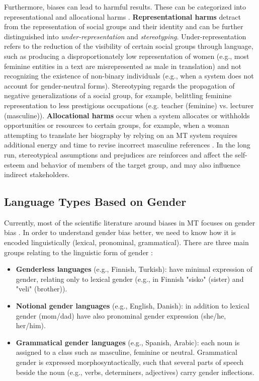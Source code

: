 Furthermore, biases can lead to harmful results. These can be categorized into representational and allocational harms \parencite{Savoldi_2021}. \textbf{Representational harms} detract from the representation of social groups and their identity and can be further distinguished into \textit{under-representation} and \textit{stereotyping}. Under-representation refers to the reduction of the visibility of certain social groups through language, such as producing a disproportionately low representation of women (e.g., most feminine entities in a text are misrepresented as male in translation) and not recognizing the existence of non-binary individuals (e.g., when a system does not account for gender-neutral forms). Stereotyping regards the propagation of negative generalizations of a social group, for example, belittling feminine representation to less prestigious occupations (e.g. teacher (feminine) vs. lecturer (masculine)). \textbf{Allocational harms} occur when a system allocates or withholds opportunities or resources to certain groups, for example, when a woman attempting to translate her biography by relying on an MT system requires additional energy and time to revise incorrect masculine references \parencite{Savoldi_2021}. In the long run, stereotypical assumptions and prejudices are reinforces and affect the self-esteem and behavior of members of the target group, and may also influence indirect stakeholders. 

\subsection{Language Types Based on Gender}
\label{sec:Background:Language}
Currently, most of the scientific literature around biases in MT focuses on gender bias \parencite{Savoldi_2021}. In order to understand gender bias better, we need to know how it is encoded linguistically (lexical, pronominal, grammatical). There are three main groups relating to the linguistic form of gender \parencite{Savoldi_2021}:
\begin{itemize}
    \item \textbf{Genderless languages} (e.g., Finnish, Turkish): have minimal expression of gender, relating only to lexical gender (e.g., in Finnish "sisko" (sister) and "veli" (brother)).
    \item \textbf{Notional gender languages} (e.g., English, Danish): in addition to lexical gender (mom/dad) have also pronominal gender expression (she/he, her/him).
    \item \textbf{Grammatical gender languages} (e.g., Spanish, Arabic): each noun is assigned to a class such as masculine, feminine or neutral. Grammatical gender is expressed morphosyntactically, such that several parts of speech beside the noun (e.g., verbs, determiners, adjectives) carry gender inflections.
\end{itemize}

